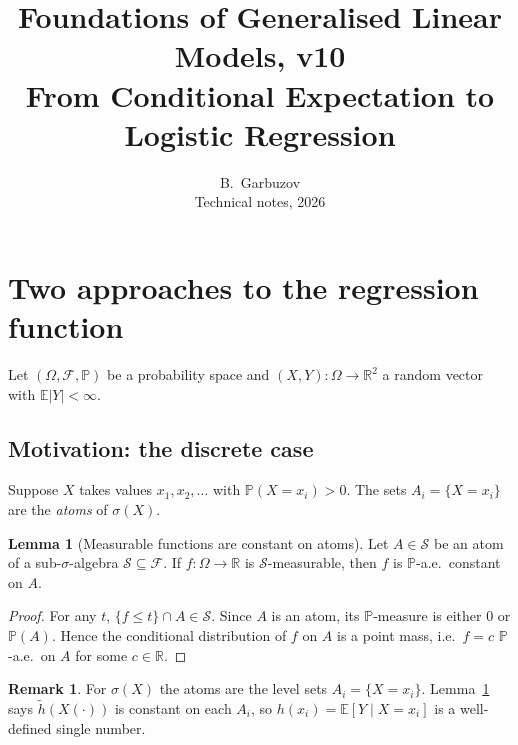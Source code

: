 \documentclass[12pt, a4paper]{article}
\title{\textbf{Foundations of Generalised Linear Models, v10}\\
\large From Conditional Expectation to Logistic Regression}
\author{B.~Garbuzov\\[4pt]
{\small Technical notes, 2026}}
\date{}
\theoremstyle{definition}
\newtheorem{lemma}{Lemma}[section]
\newtheorem{remark}{Remark}[section]
\newcommand{\E}{\mathbb{E}}
\newcommand{\R}{\mathbb{R}}
\newcommand{\Prob}{\mathbb{P}}
\newcommand{\sF}{\mathcal{F}}
\begin{document}
\maketitle
\tableofcontents
\newpage

\section{Two approaches to the regression function}

Let $(\Omega, \sF, \Prob)$ be a probability space and
$(X, Y) : \Omega \to \R^2$ a random vector with $\E|Y| < \infty$.

\subsection{Motivation: the discrete case}

Suppose $X$ takes values $x_1, x_2, \ldots$ with $\Prob(X=x_i)>0$.
The sets $A_i = \{X=x_i\}$ are the \emph{atoms} of $\sigma(X)$.

\begin{lemma}[Measurable functions are constant on atoms]
\label{lem:atoms}
Let $A \in \mathcal{S}$ be an atom of a sub-$\sigma$-algebra
$\mathcal{S} \subseteq \sF$.
If $f:\Omega\to\R$ is $\mathcal{S}$-measurable, then $f$ is
$\Prob$-a.e.\ constant on $A$.
\end{lemma}

\begin{proof}
For any $t$, $\{f\leq t\}\cap A\in\mathcal{S}$.
Since $A$ is an atom, its $\Prob$-measure is either $0$ or $\Prob(A)$.
Hence the conditional distribution of $f$ on $A$ is a point mass,
i.e.\ $f=c$ $\Prob$-a.e.\ on $A$ for some $c\in\R$.
\end{proof}

\begin{remark}
For $\sigma(X)$ the atoms are the level sets $A_i=\{X=x_i\}$.
Lemma~\ref{lem:atoms} says $\tilde h(X(\cdot))$ is constant on each
$A_i$, so $h(x_i)=\E[Y\mid X=x_i]$ is a well-defined single number.
\end{remark}
\end{document}
